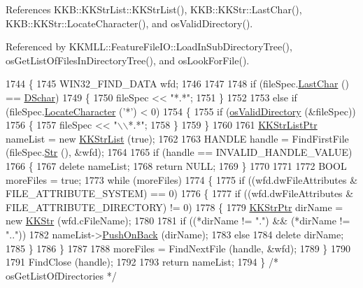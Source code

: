 References K\+K\+B\+::\+K\+K\+Str\+List\+::\+K\+K\+Str\+List(), K\+K\+B\+::\+K\+K\+Str\+::\+Last\+Char(), K\+K\+B\+::\+K\+K\+Str\+::\+Locate\+Character(), and os\+Valid\+Directory().



Referenced by K\+K\+M\+L\+L\+::\+Feature\+File\+I\+O\+::\+Load\+In\+Sub\+Directory\+Tree(), os\+Get\+List\+Of\+Files\+In\+Directory\+Tree(), and os\+Look\+For\+File().


\begin{DoxyCode}
1744 \{
1745   WIN32\_FIND\_DATA     wfd;
1746 
1747   
1748   \textcolor{keywordflow}{if}  (fileSpec.\hyperlink{class_k_k_b_1_1_k_k_str_ad1951ace757c18c2d01df666b3a4032c}{LastChar} () == \hyperlink{_o_sservices_8h_a29059d292084a3fa6111cd5ea6cac1d9}{DSchar})
1749   \{
1750     fileSpec << \textcolor{stringliteral}{"*.*"};
1751   \}
1752 
1753   \textcolor{keywordflow}{else} \textcolor{keywordflow}{if}  (fileSpec.\hyperlink{class_k_k_b_1_1_k_k_str_ad738b238e609887bbf27841f359046cd}{LocateCharacter} (\textcolor{charliteral}{'*'}) < 0)
1754   \{
1755     \textcolor{keywordflow}{if}  (\hyperlink{namespace_k_k_b_a680994cc3187d4d7aa28c536ba8a3a88}{osValidDirectory} (&fileSpec))
1756     \{
1757       fileSpec << \textcolor{stringliteral}{"\(\backslash\)\(\backslash\)*.*"};
1758     \}
1759   \}
1760 
1761   \hyperlink{class_k_k_b_1_1_k_k_str_list}{KKStrListPtr}  nameList = \textcolor{keyword}{new} \hyperlink{class_k_k_b_1_1_k_k_str_list}{KKStrList} (\textcolor{keyword}{true});
1762 
1763   HANDLE  handle = FindFirstFile  (fileSpec.\hyperlink{class_k_k_b_1_1_k_k_str_ad574e6c0fe7f6ce1ba3ab0a8ce2fbd52}{Str} (),  &wfd);
1764 
1765   \textcolor{keywordflow}{if}  (handle == INVALID\_HANDLE\_VALUE)
1766   \{
1767     \textcolor{keyword}{delete}  nameList;
1768     \textcolor{keywordflow}{return}  NULL;
1769   \}
1770 
1771 
1772   BOOL  moreFiles = \textcolor{keyword}{true};
1773   \textcolor{keywordflow}{while}  (moreFiles)
1774   \{
1775     \textcolor{keywordflow}{if}  ((wfd.dwFileAttributes & FILE\_ATTRIBUTE\_SYSTEM) == 0)  
1776     \{
1777       \textcolor{keywordflow}{if}  ((wfd.dwFileAttributes & FILE\_ATTRIBUTE\_DIRECTORY) != 0)
1778       \{
1779         \hyperlink{class_k_k_b_1_1_k_k_str}{KKStrPtr} dirName = \textcolor{keyword}{new} \hyperlink{class_k_k_b_1_1_k_k_str}{KKStr} (wfd.cFileName);
1780 
1781         \textcolor{keywordflow}{if}  ((*dirName != \textcolor{stringliteral}{"."})  &&  (*dirName != \textcolor{stringliteral}{".."}))
1782           nameList->\hyperlink{class_k_k_b_1_1_k_k_queue_aa9fba4632b54268bf71ecb42dee0b575}{PushOnBack} (dirName);
1783         \textcolor{keywordflow}{else}
1784           \textcolor{keyword}{delete}  dirName;
1785       \}
1786     \}
1787 
1788     moreFiles = FindNextFile (handle, &wfd);
1789   \}
1790 
1791   FindClose (handle);
1792 
1793   \textcolor{keywordflow}{return}  nameList;
1794 \}  \textcolor{comment}{/* osGetListOfDirectories */}
\end{DoxyCode}
